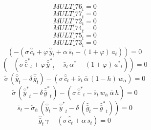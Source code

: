 \begin{dmath}
{MULT\_76}_{t}=0
\end{dmath}
\begin{dmath}
{MULT\_77}_{t}=0
\end{dmath}
\begin{dmath}
{MULT\_72}_{t}=0
\end{dmath}
\begin{dmath}
{MULT\_74}_{t}=0
\end{dmath}
\begin{dmath}
{MULT\_75}_{t}=0
\end{dmath}
\begin{dmath}
{MULT\_73}_{t}=0
\end{dmath}
\begin{dmath}
\left(-\left({{\sigma}}\, {{\hat {\bar c}}}_{t}+{{\varphi}}\, {{\hat {\bar y}}}_{t}+{{\alpha}}\, {{\bar s}}_{t}-\left(1+{{\varphi}}\right)\, {{a}}_{t}\right)\right)=0
\end{dmath}
\begin{dmath}
\left(-\left({{\sigma}}\, {{\hat {\bar c}^*}}_{t}+{{\varphi}}\, {{\hat {\bar y}^*}}_{t}-{{\bar s}}_{t}\, {{\alpha^*}}-\left(1+{{\varphi}}\right)\, {{a^*}}_{t}\right)\right)=0
\end{dmath}
\begin{dmath}
{{\tilde{\sigma}}}\, \left({{\hat {\bar y}}}_{t}-{{\delta}}\, {{\hat {\bar g}}}_{t}\right)-\left({{\sigma}}\, {{\hat {\bar c}}}_{t}+{{\bar s}}_{t}\, {{\bar{\alpha}}}\, \left(1-{{h}}\right)\, {{w_{\bar{\alpha}}}}\right)=0
\end{dmath}
\begin{dmath}
{{\tilde{\sigma}}}\, \left({{\hat {\bar y}^*}}_{t}-{{\delta}}\, {{\hat {\bar g}^*}}_{t}\right)-\left({{\sigma}}\, {{\hat {\bar c}^*}}_{t}-{{\bar s}}_{t}\, {{w_{\bar{\alpha}}}}\, {{\bar{\alpha}}}\, {{h}}\right)=0
\end{dmath}
\begin{dmath}
{{\bar s}}_{t}-{{\tilde\sigma_{\bar{\alpha}}}}\, \left({{\hat {\bar y}}}_{t}-{{\hat {\bar y}^*}}_{t}-{{\delta}}\, \left({{\hat {\bar g}}}_{t}-{{\hat {\bar g}^*}}_{t}\right)\right)=0
\end{dmath}
\begin{dmath}
{{\hat {\bar g}}}_{t}\, {{\gamma}}-\left({{\sigma}}\, {{\hat {\bar c}}}_{t}+{{\alpha}}\, {{\bar s}}_{t}\right)=0
\end{dmath}
